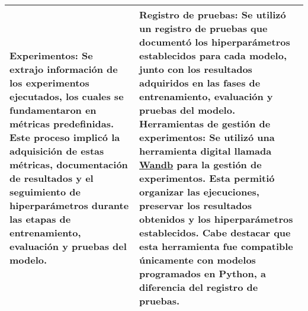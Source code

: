 \begin{table}
\begin{tabularx}{1\textwidth}{XX}
\textbf{Experimentos}: Se extrajo información de los experimentos ejecutados, los cuales se fundamentaron en métricas predefinidas. Este proceso implicó la adquisición de estas métricas, documentación de resultados y el seguimiento de hiperparámetros durante las etapas de entrenamiento, evaluación y pruebas del modelo. & \textbf{Registro de pruebas}: Se utilizó un registro de pruebas que documentó los hiperparámetros establecidos para cada modelo, junto con los resultados adquiridos en las fases de entrenamiento, evaluación y pruebas del modelo. \newline \textbf{Herramientas de gestión de experimentos}: Se utilizó una herramienta digital llamada \href{https://wandb.ai/}{Wandb} para la gestión de experimentos. Esta permitió organizar las ejecuciones, preservar los resultados obtenidos y los hiperparámetros establecidos. Cabe destacar que esta herramienta fue compatible únicamente con modelos programados en Python, a diferencia del registro de pruebas.
\\  \hline
\end{tabularx}
\begin{minipage}{\textwidth}
    \vspace{10pt}
    \label{tab:TecnicasInstrumentosRecoleccionDatos}
\end{minipage}
\end{table}